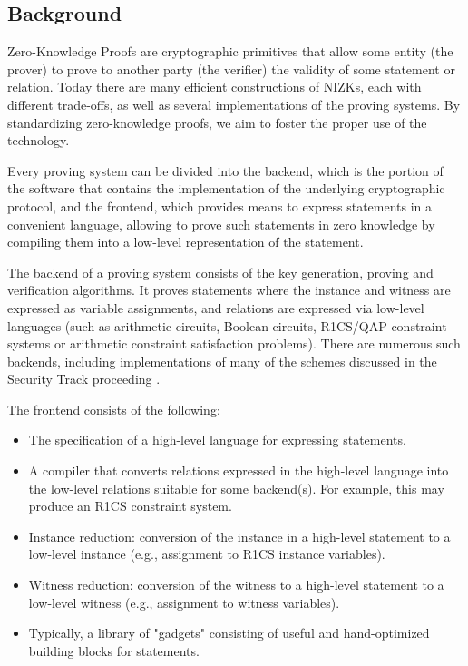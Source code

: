 \documentclass[a4paper,12pt]{article}
\begin{document}
\subsection{Background}

Zero-Knowledge Proofs are cryptographic primitives that allow some entity (the prover) to prove to another party (the verifier) the validity of some statement or relation. Today there are many efficient constructions of NIZKs, each with different trade-offs, as well as several implementations of the proving systems. By standardizing zero-knowledge proofs, we aim to foster the proper use of the technology.

Every proving system can be divided \cite{ZKProofImplementation} into the backend, which is the portion of the software that contains the implementation of the underlying cryptographic protocol, and the frontend, which provides means to express statements in a convenient language, allowing to prove such statements in zero knowledge by compiling them into a low-level representation of the statement.

The backend of a proving system consists of the key generation, proving and verification algorithms. It proves statements where the instance and witness are expressed as variable assignments, and relations are expressed via low-level languages (such as arithmetic circuits, Boolean circuits, R1CS/QAP constraint systems or arithmetic constraint satisfaction problems). There are numerous such backends, including implementations of many of the schemes discussed in the Security Track proceeding \cite{ZKProofSecurity}.

The frontend consists of the following:
\begin{itemize}
	\item The specification of a high-level language for expressing statements.
	\item A compiler that converts relations expressed in the high-level language into the low-level relations suitable for some backend(s). For example, this may produce an R1CS constraint system.
	\item Instance reduction: conversion of the instance in a high-level statement to a low-level instance (e.g., assignment to R1CS instance variables).
	\item Witness reduction: conversion of the witness to a high-level statement to a low-level witness (e.g., assignment to witness variables).
	\item Typically, a library of "gadgets" consisting of useful and hand-optimized building blocks for statements.
\end{itemize}
\end{document}
